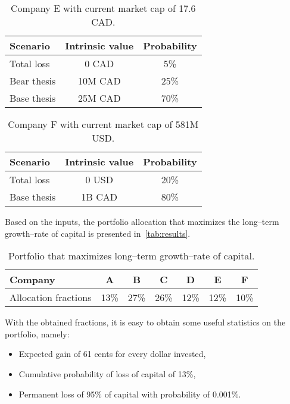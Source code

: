 \documentclass{article}
\begin{document}
\begin{table}[!ht]
\caption{Company E with current market cap of 17.6 CAD.}
\vspace{0.25cm}
\centering
\begin{tabular}{l|c|c}
Scenario & Intrinsic value & Probability \\
\hline
Total loss & 0 CAD & 5\% \\
Bear thesis & 10M CAD & 25\% \\
Base thesis & 25M CAD & 70\% \\
\end{tabular}%
\label{tab:companyE}%
\end{table}%

\begin{table}[!ht]
\caption{Company F with current market cap of 581M USD.}
\vspace{0.25cm}
\centering
\begin{tabular}{l|c|c}
Scenario & Intrinsic value & Probability \\
\hline
Total loss & 0 USD & 20\% \\
Base thesis & 1B CAD & 80\% \\
\end{tabular}%
\label{tab:companyF}%
\end{table}%


\noindent Based on the inputs, the portfolio allocation that maximizes the
long--term growth--rate of capital is presented in~\autoref{tab:results}.

\begin{table}
\caption{Portfolio that maximizes long--term growth--rate of capital.}
\vspace{0.25cm}
\centering
\begin{tabular}{l|c|c|c|c|c|c}
Company & A & B & C & D & E & F \\
\hline
Allocation fractions & 13\% & 27\% & 26\% & 12\% & 12\% & 10\% \\
\end{tabular}%
\label{tab:results}%
\end{table}%

With the obtained fractions, it is easy to obtain some useful
statistics on the portfolio, namely:
\begin{itemize}
    \item Expected gain of 61 cents for every dollar invested,
    \item Cumulative probability of loss of capital of 13\%,
    \item Permanent loss of 95\% of capital with probability of 0.001\%.
\end{itemize}
\end{document}
